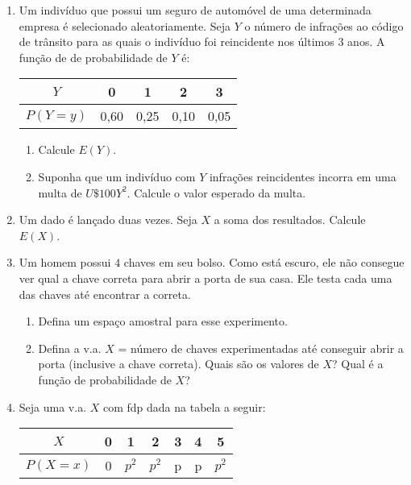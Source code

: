 \begin{enumerate}
	\solv{}

\item Um indivíduo que possui um seguro de automóvel de uma determinada empresa é selecionado aleatoriamente. Seja $Y$ o número de infrações ao código de trânsito para as quais o indivíduo foi reincidente nos últimos $3$ anos. A função de de probabilidade de $Y$ é:
    \begin{table}[htpb]
        \centering
        \begin{tabular}{|c|c|c|c|c|}
            \hline
            $Y$      & 0    & 1    & 2    & 3    \\ \hline
            $P(Y=y)$ & 0,60 & 0,25 & 0,10 & 0,05 \\ \hline
        \end{tabular}
    \end{table}
    
    \begin{enumerate}[label=\alph*)]
		\item Calcule $E(Y)$.
		\item Suponha que um indivíduo com $Y$ infrações reincidentes incorra em uma multa de $U\$ 100Y^{2}$. Calcule o valor esperado da multa.
	\end{enumerate}

\setcounter{enumi}{4}
\item Um dado é lançado duas vezes. Seja $X$ a soma dos resultados. Calcule $E(X)$.
	
\item Um homem possui $4$ chaves em seu bolso. Como está escuro, ele não consegue ver qual a
chave correta para abrir a porta de sua casa. Ele testa cada uma das chaves até encontrar a
correta.

	\begin{enumerate}[label=\alph*)]
		\item Defina um espaço amostral para esse experimento.
		\item Defina a v.a. $X$ = número de chaves experimentadas até conseguir abrir a porta (inclusive a chave correta). 
		Quais são os valores de $X$? Qual é a função de probabilidade de $X$?
	\end{enumerate}
	
\item Seja uma v.a. $X$ com fdp dada na tabela a seguir:

    \begin{table}[htpb]
        \centering
        \begin{tabular}{|c|c|c|c|c|c|c|}
            \hline
            $X$      & 0 & 1       & 2       & 3 & 4 & 5 \\ \hline
            $P(X=x)$ & 0 & $p^{2}$ & $p^{2}$ & p & p & $p^{2}$ \\ \hline
        \end{tabular}
    \end{table}
    

\end{enumerate}
